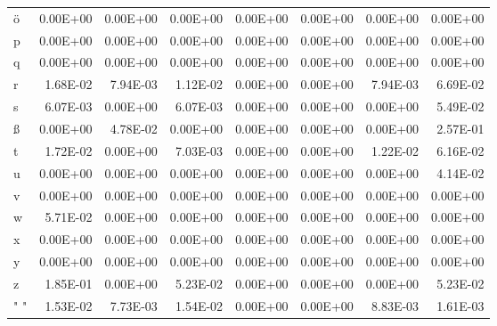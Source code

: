 \documentclass[11pt,a4paper]{CLabBookTemplate} %
\begin{document}
\begin{table}[htbp]
\begin{tabular}{lrrrrrrr}
		ö     & 0.00E+00 & 0.00E+00 & 0.00E+00 & 0.00E+00 & 0.00E+00 & 0.00E+00 & 0.00E+00 \\
		p     & 0.00E+00 & 0.00E+00 & 0.00E+00 & 0.00E+00 & 0.00E+00 & 0.00E+00 & 0.00E+00 \\
		q     & 0.00E+00 & 0.00E+00 & 0.00E+00 & 0.00E+00 & 0.00E+00 & 0.00E+00 & 0.00E+00 \\
		r     & 1.68E-02 & 7.94E-03 & 1.12E-02 & 0.00E+00 & 0.00E+00 & 7.94E-03 & 6.69E-02 \\
		s     & 6.07E-03 & 0.00E+00 & 6.07E-03 & 0.00E+00 & 0.00E+00 & 0.00E+00 & 5.49E-02 \\
		ß     & 0.00E+00 & 4.78E-02 & 0.00E+00 & 0.00E+00 & 0.00E+00 & 0.00E+00 & 2.57E-01 \\
		t     & 1.72E-02 & 0.00E+00 & 7.03E-03 & 0.00E+00 & 0.00E+00 & 1.22E-02 & 6.16E-02 \\
		u     & 0.00E+00 & 0.00E+00 & 0.00E+00 & 0.00E+00 & 0.00E+00 & 0.00E+00 & 4.14E-02 \\
		v     & 0.00E+00 & 0.00E+00 & 0.00E+00 & 0.00E+00 & 0.00E+00 & 0.00E+00 & 0.00E+00 \\
		w     & 5.71E-02 & 0.00E+00 & 0.00E+00 & 0.00E+00 & 0.00E+00 & 0.00E+00 & 0.00E+00 \\
		x     & 0.00E+00 & 0.00E+00 & 0.00E+00 & 0.00E+00 & 0.00E+00 & 0.00E+00 & 0.00E+00 \\
		y     & 0.00E+00 & 0.00E+00 & 0.00E+00 & 0.00E+00 & 0.00E+00 & 0.00E+00 & 0.00E+00 \\
		z     & 1.85E-01 & 0.00E+00 & 5.23E-02 & 0.00E+00 & 0.00E+00 & 0.00E+00 & 5.23E-02 \\
		" "   & 1.53E-02 & 7.73E-03 & 1.54E-02 & 0.00E+00 & 0.00E+00 & 8.83E-03 & 1.61E-03 \\
	\end{tabular}%
	\label{tab:CI4}%
\end{table}%
\clearpage
\end{document}
